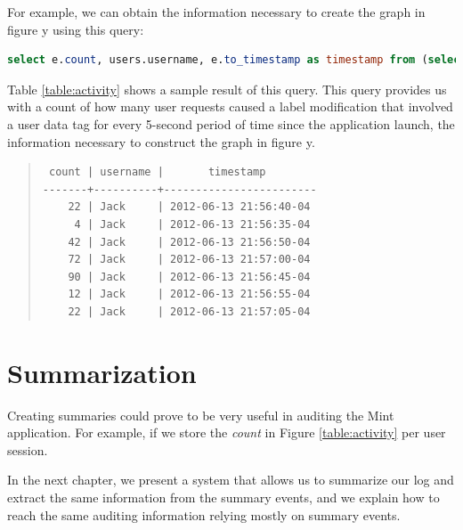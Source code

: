 For example, we can obtain the information necessary to create the graph in figure y using this query:

\begin{lstlisting}[language=SQL, deletendkeywords={TIMESTAMP}, label=query:accesses]
select e.count, users.username, e.to_timestamp as timestamp from (select count(*), tags_modified, (to_timestamp(((extract (epoch from events.timestamp)/5)::int)*5)) from events tags_modified in (select tag from users) group by (to_timestamp(((extract (epoch from events.timestamp)/5)::int)*5)), tags_modified) as e inner join users on e.tags_modified=users.tag
\end{lstlisting}

Table \ref{table:activity} shows a sample result of this query. This query provides us with a count of how many user requests caused a label modification that involved a user data tag for every 5-second period of time since the application launch, the information necessary to construct the graph in figure y.

\begin{table}
\begin{quote}
\begin{verbatim}
 count | username |       timestamp        
-------+----------+------------------------
    22 | Jack     | 2012-06-13 21:56:40-04
     4 | Jack     | 2012-06-13 21:56:35-04
    42 | Jack     | 2012-06-13 21:56:50-04
    72 | Jack     | 2012-06-13 21:57:00-04
    90 | Jack     | 2012-06-13 21:56:45-04
    12 | Jack     | 2012-06-13 21:56:55-04
    22 | Jack     | 2012-06-13 21:57:05-04
\end{verbatim}
\end{quote}
\caption*{Account activity for user \emph{Jack}}
\caption{This table shows a sample result of the \emph{accesses} view (for simplicity we only show the result for the user Jack). It details the number of user RPC requests causing a label manipulation involving a user data tag for every 5-second period since the application launched. The \emph{count} denotes such number. The \emph{username} column denotes the user who's data tag is in question. The \emph{timestamp} column denotes the start of the 5-second period.}
\label{table:activity}
\end{table}

\section{Summarization}

Creating summaries could prove to be very useful in auditing the Mint application. For example, if we store the \emph{count} in Figure \ref{table:activity} per user session.

In the next chapter, we present a system that allows us to summarize our log and extract the same information from the summary events, and we explain how to reach the same auditing information relying mostly on summary events.
